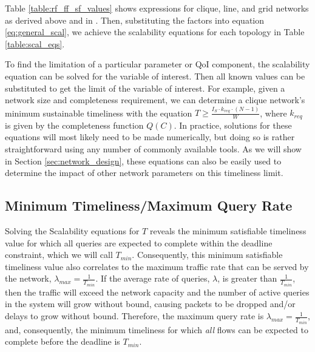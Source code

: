 Table \ref{table:rf_ff_sf_values} shows expressions for clique, line, and grid networks as derived above and in \cite{symptotics_journal}.  Then, substituting the factors into equation \ref{eq:general_scal}, we achieve the scalability equations for each topology in Table \ref{table:scal_eqs}.  


To find the limitation of a particular parameter or QoI component, the scalability equation can be solved for the variable of interest.  Then all known values can be substituted to get the limit of the variable of interest.  For example, given a network size and completeness requirement, we can determine a clique network's minimum sustainable timeliness with the equation $T  \geq \frac{I_S \cdot k_{req} \cdot (N-1)}{W}$, where $k_{req}$ is given by the completeness function $Q(C)$.  In practice, solutions for these equations will most likely need to be made numerically, but doing so is rather straightforward using any number of commonly available tools.  As we will show in Section \ref{sec:network_design}, these equations can also be easily used to determine the impact of other network parameters on this timeliness limit. 

\subsection{Minimum Timeliness/Maximum Query Rate}

Solving the Scalability equations for $T$ reveals the minimum satisfiable timeliness value for which all queries are expected to complete within the deadline constraint, which we will call $T_{min}$.  Consequently, this minimum satisfiable timeliness value also correlates to the maximum traffic rate that can be served by the network, $\lambda_{max} = \frac{1}{T_{min}}$.  If the average rate of queries, $\lambda$, is greater than $\frac{1}{T_{min}}$, then the traffic will exceed the network capacity and the number of active queries in the system will grow without bound, causing packets to be dropped and/or delays to grow without bound.  Therefore, the maximum query rate is $\lambda_{max} = \frac{1}{T_{min}}$, and, consequently, the minimum timeliness for which \emph{all} flows can be expected to complete before the deadline is $T_{min}$.


